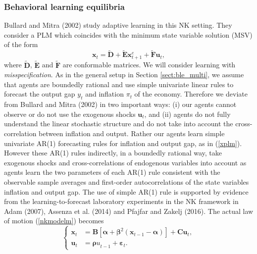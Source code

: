 \subsubsection*{Behavioral learning equilibria}
Bullard and Mitra (2002) study adaptive learning in this NK setting. They consider a PLM which coincides with the minimum state variable solution (MSV) of the form
\begin{equation}
 {\pmb x}_t = \widetilde{{\pmb D}} +\widetilde{ {\pmb E}} {\pmb x}_{t+1}^e+\widetilde{{\pmb F}}\pmb{u}_t,
\end{equation}
where $\widetilde{{\pmb D}}$, $\widetilde{{\pmb E}}$ and $\widetilde{{\pmb F}}$ are conformable matrices. We will consider learning with \textit{misspecification}. As in the general setup in Section \ref{sect:ble_multi}, we assume that agents are boundedly rational and use simple univariate linear rules to forecast the output gap $y_t$ and inflation $\pi_t$ of the economy. Therefore we deviate from Bullard and Mitra (2002) in two important ways: (i) our agents cannot observe or do not use the exogenous shocks ${\pmb u}_t$, and (ii) agents do not fully understand the linear stochastic structure and do not take into account the cross-correlation between inflation and output. Rather our agents learn simple  univariate AR(1) forecasting rules for inflation and output gap, as in (\ref{xplm}). However these AR(1) rules indirectly, in a boundedly rational way, take exogenous shocks and cross-correlations of endogenous variables into account as agents learn the two parameters of each AR(1) rule consistent with the observable sample averages and first-order autocorrelations of the state variables inflation and output gap. The use of simple AR(1) rule is supported by evidence from the learning-to-forecast laboratory experiments in the NK framework in Adam (2007), Assenza et al. (2014) and Pfajfar and Zakelj (2016).
The actual law of motion (\ref{nkmodelm}) becomes
\begin{equation}\label{nkmodelb}
    \left\{
    \begin{split}
          {\pmb x}_t&={\pmb B}[{\pmb\alpha}+{\pmb\beta}^2({\pmb x}_{t-1}-{\pmb\alpha})]+\pmb{Cu}_t,\\
          {\pmb u}_t&={\pmb \rho u}_{t-1}+{\pmb\varepsilon}_t.
    \end{split}
    \right.
\end{equation}


